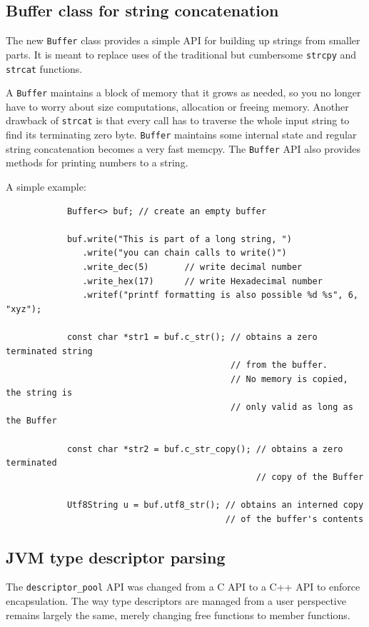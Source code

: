 \documentclass[12pt,a4paper,oneside]{article}
\newcommand{\cpp}[1]{\lstinline[language=C++]{#1}}
\begin{document}
\subsection{Buffer class for string concatenation}
	The new \cpp{Buffer} class provides a simple API for building up strings from smaller parts.
	It is meant to replace uses of the traditional but cumbersome \cpp{strcpy} and \cpp{strcat} functions.

	A \cpp{Buffer} maintains a block of memory that it grows as needed, so you no longer have to worry about 
	size computations, allocation or freeing memory.
	Another drawback of \cpp{strcat} is that every call has to traverse the whole input string to find its terminating zero byte.
	\cpp{Buffer} maintains some internal state and regular string concatenation becomes a very fast memcpy.
	The \cpp{Buffer} API also provides methods for printing numbers to a string.

	A simple example:
		\begin{lstlisting}
			Buffer<> buf; // create an empty buffer

			buf.write("This is part of a long string, ")
			   .write("you can chain calls to write()")
			   .write_dec(5)       // write decimal number
			   .write_hex(17)      // write Hexadecimal number
			   .writef("printf formatting is also possible %d %s", 6, "xyz");

			const char *str1 = buf.c_str(); // obtains a zero terminated string
			                                // from the buffer.
			                                // No memory is copied, the string is
			                                // only valid as long as the Buffer

			const char *str2 = buf.c_str_copy(); // obtains a zero terminated
			                                     // copy of the Buffer

			Utf8String u = buf.utf8_str(); // obtains an interned copy 
			                               // of the buffer's contents
		\end{lstlisting}

\subsection{JVM type descriptor parsing}
	The \cpp{descriptor_pool} API was changed from a C API to a C++ API to enforce encapsulation.
	The way type descriptors are managed from a user perspective remains largely the same, merely 
	changing free functions to member functions.
	
\end{document}

